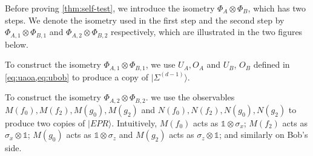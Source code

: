 \documentclass[11pt,letterpaper]{article}
\newcommand{\ket}[1]{|#1\rangle}
\newcommand{\x}{\otimes}
\newcommand{\1}{\mathbb{1}}
\newcommand{\EPR}[1]{\Sigma^{(#1)}}
\newcommand{\paulix}{\sigma_x}
\newcommand{\pauliz}{\sigma_z}
\theoremstyle{definition}
\begin{document}
Before proving \cref{thm:self-test}, we introduce the isometry 
$\Phi_A \x \Phi_B$, which has two steps. 
We denote the isometry used in the first step and the second step by $\Phi_{A,1} \x \Phi_{B,1}$ and 
$\Phi_{A,2} \x \Phi_{B,2}$ respectively, which are illustrated 
in the two figures below.

To construct the isometry $\Phi_{A,1} \x \Phi_{B,1}$, 
we use $U_A, O_A$ and $U_B$, $O_B$ defined in \cref{eq:uaoa,eq:ubob} 
to produce a copy of $\ket{\EPR{d-1}}$.

To construct the isometry $\Phi_{A,2} \x \Phi_{B,2}$. we use the observables $M(f_0),M(f_2), M(g_0), M(g_2)$ and 
$N(f_0), N(f_2), N(g_0), N(g_2)$ to produce two copies of $\ket{EPR}$.
Intuitively, $M(f_0)$ acts as $\1 \x \paulix$; $M(f_2)$ acts as $\paulix \x \1 $;
$M(g_0)$ acts as $\1 \x \pauliz$ and $M(g_2)$ acts as $\pauliz \x \1$; and similarly on Bob's side.
\end{document}
